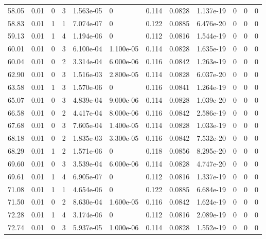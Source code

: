 \documentclass[preview]{standalone}
\begin{document}
{{{\begin{tabular}{L{1.2cm}C{1.2cm} C{0.3cm}C{0.5cm} C{1.4cm}C{1.4cm} C{1.4cm}C{1.4cm} C{1.6cm}C{1.6cm} C{1.6cm}C{1.6cm}}
  58.05  &  0.01  & 0     &  3 &  1.563e-05  & 0  &  0.114&   0.0828& 1.137e-19 & 0   &  0 & 0  \\ 
  58.83  &  0.01  & 1     &  1 &  7.074e-07  & 0  &  0.122&   0.0885& 6.476e-20 & 0   &  0 & 0  \\ 
  59.13  &  0.01  & 1     &  4 &  1.194e-06  & 0  &  0.112&   0.0816& 1.544e-19 & 0   &  0 & 0  \\ 
  60.01  &  0.01  & 0     &  3 &  6.100e-04  & 1.100e-05  &  0.114&   0.0828& 1.635e-19 & 0   &  0 & 0  \\ 
  60.04  &  0.01  & 0     &  2 &  3.314e-04  & 6.000e-06  &  0.116&   0.0842& 1.263e-19 & 0   &  0 & 0  \\ 
  62.90  &  0.01  & 0     &  3 &  1.516e-03  & 2.800e-05  &  0.114&   0.0828& 6.037e-20 & 0   &  0 & 0  \\ 
  63.58  &  0.01  & 1     &  3 &  1.570e-06  & 0  &  0.116&   0.0841& 1.264e-19 & 0   &  0 & 0  \\ 
  65.07  &  0.01  & 0     &  3 &  4.839e-04  & 9.000e-06  &  0.114&   0.0828& 1.039e-20 & 0   &  0 & 0  \\ 
  66.58  &  0.01  & 0     &  2 &  4.417e-04  & 8.000e-06  &  0.116&   0.0842& 2.586e-19 & 0   &  0 & 0  \\ 
  67.68  &  0.01  & 0     &  3 &  7.605e-04  & 1.400e-05  &  0.114&   0.0828& 1.033e-19 & 0   &  0 & 0  \\ 
  68.18  &  0.01  & 0     &  2 &  1.835e-03  & 3.300e-05  &  0.116&   0.0842& 7.532e-20 & 0   &  0 & 0  \\ 
  68.29  &  0.01  & 1     &  2 &  1.571e-06  & 0  &  0.118&   0.0856& 8.295e-20 & 0   &  0 & 0  \\ 
  69.60  &  0.01  & 0     &  3 &  3.539e-04  & 6.000e-06  &  0.114&   0.0828& 4.747e-20 & 0   &  0 & 0  \\ 
  69.61  &  0.01  & 1     &  4 &  6.905e-07  & 0  &  0.112&   0.0816& 1.337e-19 & 0   &  0 & 0  \\ 
  71.08  &  0.01  & 1     &  1 &  4.654e-06  & 0  &  0.122&   0.0885& 6.684e-19 & 0   &  0 & 0  \\ 
  71.50  &  0.01  & 0     &  2 &  8.630e-04  & 1.600e-05  &  0.116&   0.0842& 1.624e-19 & 0   &  0 & 0  \\ 
  72.28  &  0.01  & 1     &  4 &  3.174e-06  & 0  &  0.112&   0.0816& 2.089e-19 & 0   &  0 & 0  \\ 
  72.74  &  0.01  & 0     &  3 &  5.937e-05  & 1.000e-06  &  0.114&   0.0828& 1.552e-19 & 0   &  0 & 0  \\ 

\end{tabular}}}}
\end{document}
